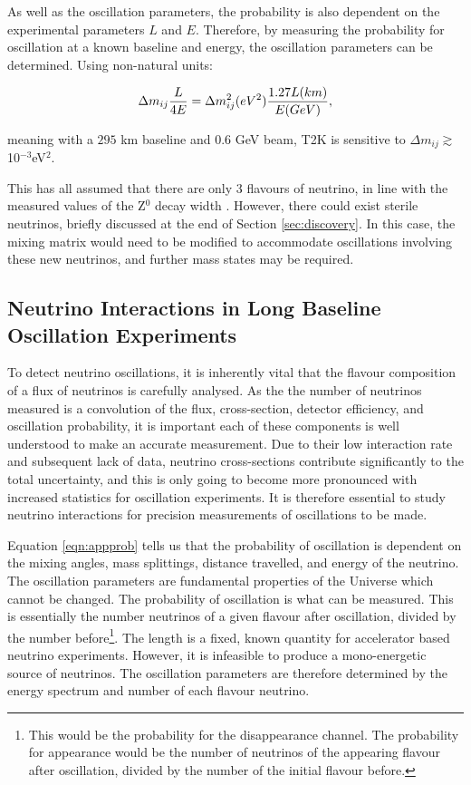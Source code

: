 As well as the oscillation parameters, the probability is also dependent on the experimental parameters $L$ and $E$. Therefore, by measuring the probability for oscillation at a known baseline and energy, the oscillation parameters can be determined. Using non-natural units:

\begin{equation}
\Delta m_{ij} \frac{L}{4E} = \Delta m_{ij}^2 (eV^2) \frac{1.27 L (km)}{E (GeV)},
\vspace{10pt}
\end{equation}

meaning with a $295$ km baseline and $0.6$ GeV beam, T2K is sensitive to $\Delta m_{ij} \gtrsim$ 10$^{-3}$eV$^2$.

This has all assumed that there are only 3 flavours of neutrino, in line with the measured values of the Z$^0$ decay width \cite{lepslac,universalN}. However, there could exist sterile neutrinos, briefly discussed at the end of Section \ref{sec:discovery}. In this case, the mixing matrix would need to be modified to accommodate oscillations involving these new neutrinos, and further mass states may be required. 

\subsection{Neutrino Interactions in Long Baseline Oscillation Experiments}\label{sec:interactions}

To detect neutrino oscillations, it is inherently vital that the flavour composition of a flux of neutrinos is carefully analysed. As the the number of neutrinos measured is a convolution of the flux, cross-section, detector efficiency, and oscillation probability, it is important each of these components is well understood to make an accurate measurement. Due to their low interaction rate and subsequent lack of data, neutrino cross-sections contribute significantly to the total uncertainty, and this is only going to become more pronounced with increased statistics for oscillation experiments. It is therefore essential to study neutrino interactions for precision measurements of oscillations to be made.

Equation \eqref{eqn:appprob} tells us that the probability of oscillation is dependent on the mixing angles, mass splittings, distance travelled, and energy of the neutrino. The oscillation parameters are fundamental properties of the Universe which cannot be changed. The probability of oscillation is what can be measured. This is essentially the number neutrinos of a given flavour after oscillation, divided by the number before\footnote{This would be the probability for the disappearance channel. The probability for appearance would be the number of neutrinos of the appearing flavour after oscillation, divided by the number of the initial flavour before.}. The length is a fixed, known quantity for accelerator based neutrino experiments. However, it is infeasible to produce a mono-energetic source of neutrinos. The oscillation parameters are therefore determined by the energy spectrum and number of each flavour neutrino.

